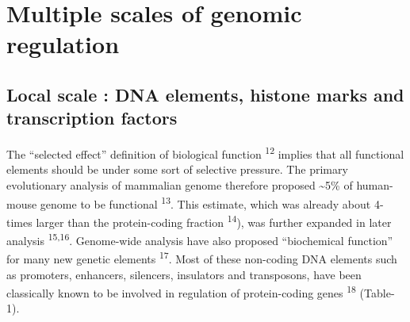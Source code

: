\documentclass[11pt,twoside]{MPIthesis}
\theoremstyle{definition}
\theoremstyle{definition}
\theoremstyle{definition}
\theoremstyle{remark}
\begin{document}
\section{Multiple scales of genomic
regulation}\label{multiple-scales-of-genomic-regulation}

\subsection{Local scale : DNA elements, histone marks and transcription
factors}\label{local-scale-dna-elements-histone-marks-and-transcription-factors}

The ``selected effect'' definition of biological function
\textsuperscript{12} implies that all functional elements should be
under some sort of selective pressure. The primary evolutionary analysis
of mammalian genome therefore proposed \textasciitilde{}5\% of
human-mouse genome to be functional \textsuperscript{13}. This estimate,
which was already about 4-times larger than the protein-coding fraction
\textsuperscript{14}), was further expanded in later analysis
\textsuperscript{15,16}. Genome-wide analysis have also proposed
``biochemical function'' for many new genetic elements
\textsuperscript{17}. Most of these non-coding DNA elements such as
promoters, enhancers, silencers, insulators and transposons, have been
classically known to be involved in regulation of protein-coding genes
\textsuperscript{18} (Table-1).
\end{document}
